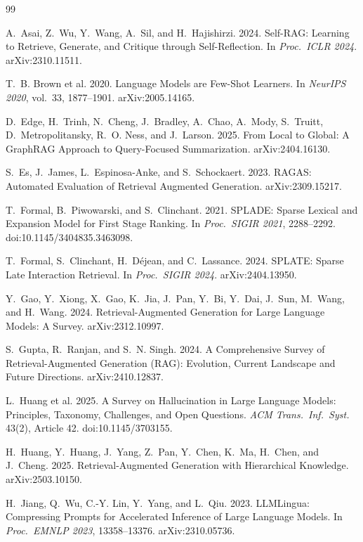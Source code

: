 \documentclass[sigconf,review,anonymous]{acmart}
\begin{document}
\begin{thebibliography}{99}

A.~Asai, Z.~Wu, Y.~Wang, A.~Sil, and H.~Hajishirzi. 2024.
Self-RAG: Learning to Retrieve, Generate, and Critique through Self-Reflection.
In \emph{Proc.\ ICLR 2024}. arXiv:2310.11511.

T.~B. Brown et al. 2020. Language Models are Few-Shot Learners.
In \emph{NeurIPS 2020}, vol.~33, 1877--1901. arXiv:2005.14165.

D.~Edge, H.~Trinh, N.~Cheng, J.~Bradley, A.~Chao, A.~Mody, S.~Truitt,
D.~Metropolitansky, R.~O. Ness, and J.~Larson. 2025.
From Local to Global: A GraphRAG Approach to Query-Focused Summarization.
arXiv:2404.16130.

S.~Es, J.~James, L.~Espinosa-Anke, and S.~Schockaert. 2023.
RAGAS: Automated Evaluation of Retrieval Augmented Generation. arXiv:2309.15217.

T.~Formal, B.~Piwowarski, and S.~Clinchant. 2021. SPLADE: Sparse Lexical and
Expansion Model for First Stage Ranking. In \emph{Proc.\ SIGIR 2021}, 2288--2292.
doi:10.1145/3404835.3463098.

T.~Formal, S.~Clinchant, H.~D\'ejean, and C.~Lassance. 2024.
SPLATE: Sparse Late Interaction Retrieval. In \emph{Proc.\ SIGIR 2024}.
arXiv:2404.13950.

Y.~Gao, Y.~Xiong, X.~Gao, K.~Jia, J.~Pan, Y.~Bi, Y.~Dai, J.~Sun, M.~Wang, and
H.~Wang. 2024. Retrieval-Augmented Generation for Large Language Models: A
Survey. arXiv:2312.10997.

S.~Gupta, R.~Ranjan, and S.~N. Singh. 2024. A Comprehensive Survey of
Retrieval-Augmented Generation (RAG): Evolution, Current Landscape and Future
Directions. arXiv:2410.12837.

L.~Huang et al. 2025. A Survey on Hallucination in Large Language Models:
Principles, Taxonomy, Challenges, and Open Questions.
\emph{ACM Trans.\ Inf.\ Syst.} 43(2), Article 42. doi:10.1145/3703155.

H.~Huang, Y.~Huang, J.~Yang, Z.~Pan, Y.~Chen, K.~Ma, H.~Chen, and J.~Cheng. 2025.
Retrieval-Augmented Generation with Hierarchical Knowledge. arXiv:2503.10150.

H.~Jiang, Q.~Wu, C.-Y. Lin, Y.~Yang, and L.~Qiu. 2023. LLMLingua: Compressing
Prompts for Accelerated Inference of Large Language Models. In \emph{Proc.\
EMNLP 2023}, 13358--13376. arXiv:2310.05736.


\end{thebibliography}
\end{document}
